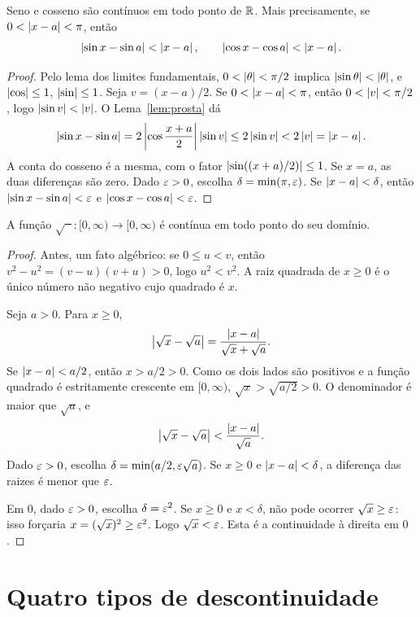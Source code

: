 \documentclass[11pt,a4paper]{article}
\begin{document}
\begin{teorema}
\label{teo:sen-cos-cont}
Seno e cosseno s\~ao cont\'inuos em todo ponto de $\mathbb{R}$. Mais precisamente, se $0<\left\lvert x-a \right\rvert<\pi$, ent\~ao
\[
\left\lvert \sin x-\sin a \right\rvert<\left\lvert x-a \right\rvert, \qquad \left\lvert \cos x-\cos a \right\rvert<\left\lvert x-a \right\rvert.
\]
\end{teorema}

\begin{proof}
Pelo lema dos limites fundamentais, $0<\left\lvert \theta \right\rvert<\pi/2$ implica $\left\lvert \sin\theta \right\rvert<\left\lvert \theta \right\rvert$, e $\left\lvert \cos \right\rvert\le 1$, $\left\lvert \sin \right\rvert\le 1$. Seja $v=(x-a)/2$. Se $0<\left\lvert x-a \right\rvert<\pi$, ent\~ao $0<\left\lvert v \right\rvert<\pi/2$, logo $\left\lvert \sin v \right\rvert<\left\lvert v \right\rvert$. O Lema~\ref{lem:prosta} d\'a
\[
\left\lvert \sin x-\sin a \right\rvert=2\left\lvert \cos\frac{x+a}{2} \right\rvert\left\lvert \sin v \right\rvert\le 2\left\lvert \sin v \right\rvert<2\left\lvert v \right\rvert=\left\lvert x-a \right\rvert.
\]
A conta do cosseno \'e a mesma, com o fator $\left\lvert \sin((x+a)/2) \right\rvert\le 1$. Se $x=a$, as duas diferen\c{c}as s\~ao zero. Dado $\varepsilon>0$, escolha $\delta=\min(\pi,\varepsilon)$. Se $\left\lvert x-a \right\rvert<\delta$, ent\~ao $\left\lvert \sin x-\sin a \right\rvert<\varepsilon$ e $\left\lvert \cos x-\cos a \right\rvert<\varepsilon$.
\end{proof}

\begin{teorema}
\label{teo:raiz}
A fun\c{c}\~ao $\sqrt{\phantom{x}}\colon[0,\infty)\to[0,\infty)$ \'e cont\'inua em todo ponto do seu dom\'inio.
\end{teorema}

\begin{proof}
Antes, um fato alg\'ebrico: se $0\le u<v$, ent\~ao $v^2-u^2=(v-u)(v+u)>0$, logo $u^2<v^2$. A raiz quadrada de $x\ge 0$ \'e o \'unico n\'umero n\~ao negativo cujo quadrado \'e $x$.

Seja $a>0$. Para $x\ge 0$,
\[
\left\lvert \sqrt{x}-\sqrt{a} \right\rvert=\frac{\left\lvert x-a \right\rvert}{\sqrt{x}+\sqrt{a}}.
\]
Se $\left\lvert x-a \right\rvert<a/2$, ent\~ao $x>a/2>0$. Como os dois lados s\~ao positivos e a fun\c{c}\~ao quadrado \'e estritamente crescente em $[0,\infty)$, $\sqrt{x}>\sqrt{a/2}>0$. O denominador \'e maior que $\sqrt{a}$, e
\[
\left\lvert \sqrt{x}-\sqrt{a} \right\rvert<\frac{\left\lvert x-a \right\rvert}{\sqrt{a}}.
\]
Dado $\varepsilon>0$, escolha $\delta=\min(a/2,\varepsilon\sqrt{a})$. Se $x\ge 0$ e $\left\lvert x-a \right\rvert<\delta$, a diferen\c{c}a das raizes \'e menor que $\varepsilon$.

Em $0$, dado $\varepsilon>0$, escolha $\delta=\varepsilon^2$. Se $x\ge 0$ e $x<\delta$, n\~ao pode ocorrer $\sqrt{x}\ge\varepsilon$: isso for\c{c}aria $x=(\sqrt{x})^2\ge\varepsilon^2$. Logo $\sqrt{x}<\varepsilon$. Esta \'e a continuidade \`a direita em $0$.
\end{proof}

\section{Quatro tipos de descontinuidade}
\label{sec:tipos}
\end{document}
